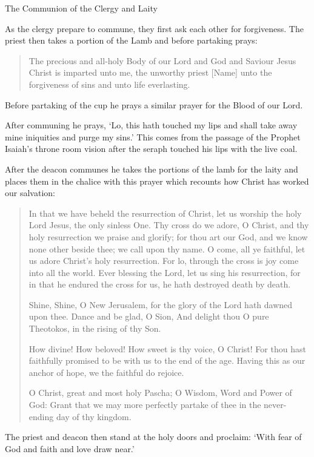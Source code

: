 \documentclass[
]{article}
\newcommand{\RL}[1]{\beginR #1\endR}
\begin{document}
The Communion of the Clergy and Laity

As the clergy prepare to commune, they first ask each other for
forgiveness. The priest then takes a portion of the Lamb and before
partaking prays:

\begin{quote}
The precious and all-holy Body of our Lord and God and Saviour Jesus
Christ is imparted unto me, the unworthy priest {[}Name{]} unto the
forgiveness of sins and unto life everlasting.
\end{quote}

Before partaking of the cup he prays a similar prayer for the Blood of
our Lord.

After communing he prays, `Lo, this hath touched my lips and shall take
away mine iniquities and purge my sins.' This comes from the passage of
the Prophet Isaiah's throne room vision after the seraph touched his
lips with the live coal.

After the deacon communes he takes the portions of the lamb for the
laity and places them in the chalice with this prayer which recounts how
Christ has worked our salvation:

\begin{quote}
In that we have beheld the resurrection of Christ, let us worship the
holy Lord Jesus, the only sinless One. Thy cross do we adore, O Christ,
and thy holy resurrection we praise and glorify; for thou art our God,
and we know none other beside thee; we call upon thy name. O come, all
ye faithful, let us adore Christ\RL{'}s holy resurrection. For lo,
through the cross is joy come into all the world. Ever blessing the
Lord, let us sing his resurrection, for in that he endured the cross for
us, he hath destroyed death by death.

Shine, Shine, O New Jerusalem, for the glory of the Lord hath dawned
upon thee. Dance and be glad, O Sion, And delight thou O pure Theotokos,
in the rising of thy Son.

How divine! How beloved! How sweet is thy voice, O Christ! For thou hast
faithfully promised to be with us to the end of the age. Having this as
our anchor of hope, we the faithful do rejoice.

O Christ, great and most holy Pascha; O Wisdom, Word and Power of God:
Grant that we may more perfectly partake of thee in the never-ending day
of thy kingdom.
\end{quote}

The priest and deacon then stand at the holy doors and proclaim: `With
fear of God and faith and love draw near.'
\end{document}
